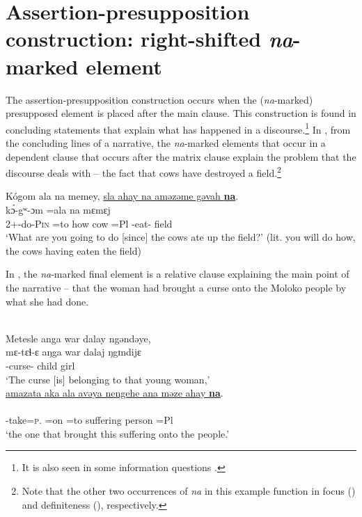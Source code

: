 \section{Assertion-presupposition construction: right-shifted \textit{na}-marked element}\label{sec:11.3}
\hypertarget{RefHeading1213261525720847}{}
The assertion-presupposition construction occurs when the (\textit{na}{}-marked) presupposed element is placed after the main clause. This construction is found in concluding statements that explain what has happened in a discourse.\footnote{It is also seen in some information questions .} In , from the concluding lines of a narrative, the \textit{na}{}-marked elements that occur in a dependent clause that occurs after the matrix clause explain the problem that the discourse deals with -- the fact that cows have destroyed a field.\footnote{Note that the other two occurrences of \textit{na} in this example function in focus () and definiteness (), respectively.} 

\ea \label{ex:11:39}
Kógom  ala  na  memey,  \underline{sla  ahay  na  aməzəme  gəvah  \textbf{na}}.\\
\gll  k\'ɔ-gʷ{}-ɔm     =ala  na      mɛmɛj                  \\
      2+{\IFV}-do-\textsc{Pin}  =to  {\PSP}   how   cow  =Pl  {\PSP}  {\DEP}-eat{}-{\CL}  field  {\PSP}\\
\glt  ‘What are you going to do [since] the cows ate up the field?’ (lit. you will do how, the cows having eaten the field)
\z

In , the \textit{na}-marked final element is a relative clause explaining the main point of the narrative -- that the woman had brought a curse onto the Moloko people by what she had done. 

\ea \label{ex:11:40}
\\
Metesle  anga  war  dalay  ngəndəye, \\ 
\gll  mɛ-tɛɬ-ɛ  aŋga war dalaj  ŋgɪndijɛ \\ 
      {\NOM}{}-curse-{\CL}   {\POSS}   child  girl  {\DEM} \\
\glt ‘The curse [is] belonging to that young woman,’\\      
      
      \medskip
\underline{amazata  aka  ala  avəya  nengehe  ana  məze  ahay  \textbf{na}}. \\      
\gll {}           \\
     {\DEP}-take=\textsc{p}.{\IO} =on   =to suffering {\DEM}      {\DAT}  person    =Pl   {\PSP}\\
\glt  ‘the one that brought this suffering onto the people.’  
\z

